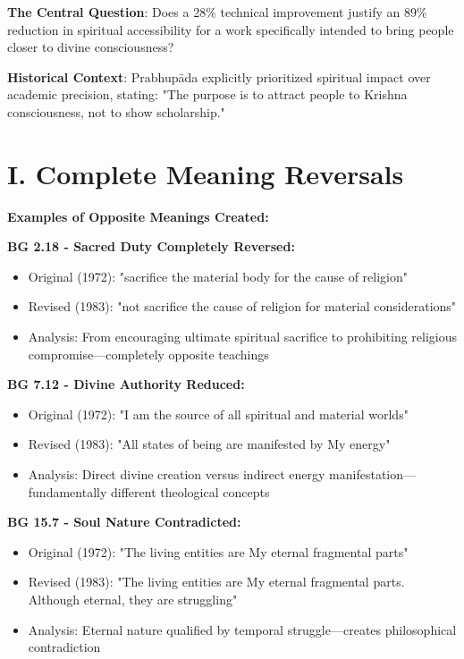 \documentclass[11pt,twoside]{book}
\begin{document}
\textbf{\textbf{The Central Question}}: Does a 28\% technical improvement justify an 89\% reduction in spiritual accessibility for a work specifically intended to bring people closer to divine consciousness?

\textbf{\textbf{Historical Context}}: Prabhupāda explicitly prioritized spiritual impact over academic precision, stating: "The purpose is to attract people to Krishna consciousness, not to show scholarship."
\section*{I. Complete Meaning Reversals}
\label{sec:orge585eb1}

\textbf{\textbf{Examples of Opposite Meanings Created:}}

\textbf{\textbf{BG 2.18 - Sacred Duty Completely Reversed:}}
\begin{itemize}
\item Original (1972): "sacrifice the material body for the cause of religion"
\item Revised (1983): "not sacrifice the cause of religion for material considerations"
\item Analysis: From encouraging ultimate spiritual sacrifice to prohibiting religious 
compromise—completely opposite teachings
\end{itemize}

\textbf{\textbf{BG 7.12 - Divine Authority Reduced:}}
\begin{itemize}
\item Original (1972): "I am the source of all spiritual and material worlds"
\item Revised (1983): "All states of being are manifested by My energy"
\item Analysis: Direct divine creation versus indirect energy 
manifestation—fundamentally different theological concepts
\end{itemize}

\textbf{\textbf{BG 15.7 - Soul Nature Contradicted:}}
\begin{itemize}
\item Original (1972): "The living entities are My eternal fragmental parts"
\item Revised (1983): "The living entities are My eternal fragmental parts. Although eternal, they are struggling"
\item Analysis: Eternal nature qualified by temporal struggle—creates philosophical 
contradiction
\end{itemize}
\end{document}
